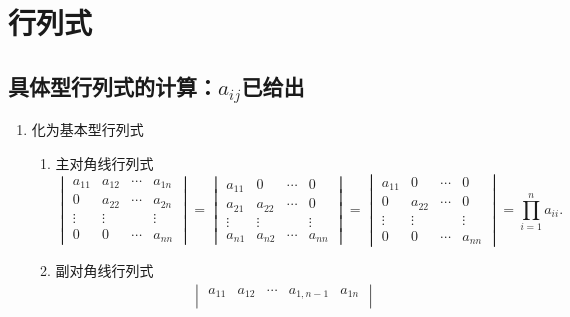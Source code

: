 \chapter{行列式}

\section{具体型行列式的计算：$a_{ij}$已给出}
\begin{enumerate}
    \item 化为基本型行列式
          \DTwoThree
          \begin{enumerate}
              \item 主对角线行列式
                    $$\begin{vmatrix}
                            a_{11} & a_{12} & \cdots & a_{1n} \\
                            0      & a_{22} & \cdots & a_{2n} \\
                            \vdots & \vdots &        & \vdots \\
                            0      & 0      & \cdots & a_{nn}
                        \end{vmatrix}=
                        \begin{vmatrix}
                            a_{11} & 0      & \cdots & 0      \\
                            a_{21} & a_{22} & \cdots & 0      \\
                            \vdots & \vdots &        & \vdots \\
                            a_{n1} & a_{n2} & \cdots & a_{nn}
                        \end{vmatrix}=
                        \begin{vmatrix}
                            a_{11} & 0      & \cdots & 0      \\
                            0      & a_{22} & \cdots & 0      \\
                            \vdots & \vdots &        & \vdots \\
                            0      & 0      & \cdots & a_{nn}
                        \end{vmatrix}=\prod_{i=1}^na_{ii}.$$
              \item 副对角线行列式
                    $$\begin{aligned}
                            \begin{vmatrix}
                                a_{11} & a_{12} & \cdots & a_{1,n-1} & a_{1n} \\

\end{vmatrix}
\end{aligned}$$
\end{enumerate}
\end{enumerate}
